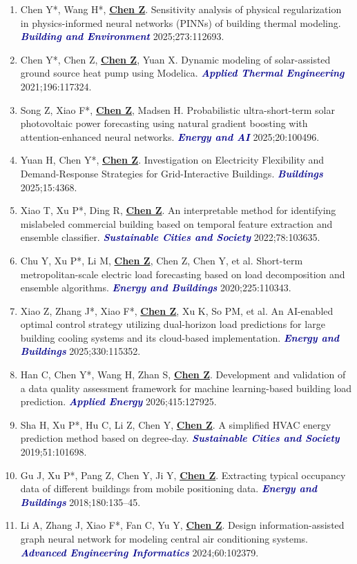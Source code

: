 \documentclass[11pt,a4paper]{article}
\newcommand{\me}[1]{\underline{\textbf{#1}}}
\newcommand{\journal}[1]{\textcolor{darkblue}{\textbf{\textit{#1}}}}
\begin{document}
\begin{enumerate}
\item Chen Y*, Wang H*, \me{Chen Z}. Sensitivity analysis of physical regularization in physics-informed neural networks (PINNs) of building thermal modeling. \journal{Building and Environment} 2025;273:112693.
\item Chen Y*, Chen Z, \me{Chen Z}, Yuan X. Dynamic modeling of solar-assisted ground source heat pump using Modelica. \journal{Applied Thermal Engineering} 2021;196:117324.
\item Song Z, Xiao F*, \me{Chen Z}, Madsen H. Probabilistic ultra-short-term solar photovoltaic power forecasting using natural gradient boosting with attention-enhanced neural networks. \journal{Energy and AI} 2025;20:100496.
\item Yuan H, Chen Y*, \me{Chen Z}. Investigation on Electricity Flexibility and Demand-Response Strategies for Grid-Interactive Buildings. \journal{Buildings} 2025;15:4368.
\item Xiao T, Xu P*, Ding R, \me{Chen Z}. An interpretable method for identifying mislabeled commercial building based on temporal feature extraction and ensemble classifier. \journal{Sustainable Cities and Society} 2022;78:103635.
\item Chu Y, Xu P*, Li M, \me{Chen Z}, Chen Z, Chen Y, et al. Short-term metropolitan-scale electric load forecasting based on load decomposition and ensemble algorithms. \journal{Energy and Buildings} 2020;225:110343.
\item Xiao Z, Zhang J*, Xiao F*, \me{Chen Z}, Xu K, So PM, et al. An AI-enabled optimal control strategy utilizing dual-horizon load predictions for large building cooling systems and its cloud-based implementation. \journal{Energy and Buildings} 2025;330:115352.
\item Han C, Chen Y*, Wang H, Zhan S, \me{Chen Z}. Development and validation of a data quality assessment framework for machine learning-based building load prediction. \journal{Applied Energy} 2026;415:127925.
\item Sha H, Xu P*, Hu C, Li Z, Chen Y, \me{Chen Z}. A simplified HVAC energy prediction method based on degree-day. \journal{Sustainable Cities and Society} 2019;51:101698.
\item Gu J, Xu P*, Pang Z, Chen Y, Ji Y, \me{Chen Z}. Extracting typical occupancy data of different buildings from mobile positioning data. \journal{Energy and Buildings} 2018;180:135--45.
\item Li A, Zhang J, Xiao F*, Fan C, Yu Y, \me{Chen Z}. Design information-assisted graph neural network for modeling central air conditioning systems. \journal{Advanced Engineering Informatics} 2024;60:102379.
\end{enumerate}
\end{document}
